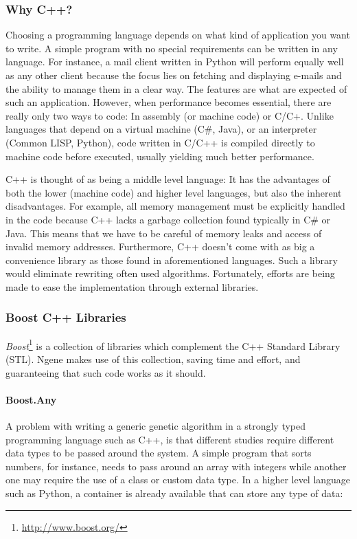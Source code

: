 \subsubsection{Why C++?}
Choosing a programming language depends on what kind of application you want to write. A simple program with no special requirements can be written in any language. For instance, a mail client written in Python will perform equally well as any other client because the focus lies on fetching and displaying e-mails and the ability to manage them in a clear way. The features are what are expected of such an application. However, when performance becomes essential, there are really only two ways to code: In assembly (or machine code) or C/C+. Unlike languages that depend on a virtual machine (C\#, Java), or an interpreter (Common LISP, Python), code written in C/C++ is compiled directly to machine code before executed, usually yielding much better performance.

C++ is thought of as being a middle level language: It has the advantages of both the lower (machine code) and higher level languages, but also the inherent disadvantages. For example, all memory management must be explicitly handled in the code because C++ lacks a garbage collection found typically in C\# or Java. This means that we have to be careful of memory leaks and access of invalid memory addresses. Furthermore, C++ doesn't come with as big a convenience library as those found in aforementioned languages. Such a library would eliminate rewriting often used algorithms. Fortunately, efforts are being made to ease the implementation through external libraries.

\subsubsection{Boost C++ Libraries}
\emph{Boost}\footnote{\url{http://www.boost.org/}} is a collection of libraries which complement the C++ Standard Library (STL). Ngene makes use of this collection, saving time and effort, and guaranteeing that such code works as it should.

\paragraph{\textbf{Boost.Any}}\cite{henney2001}
A problem with writing a generic genetic algorithm in a strongly typed programming language such as C++, is that different studies require different data types to be passed around the system. A simple program that sorts numbers, for instance, needs to pass around an array with integers while another one may require the use of a class or custom data type. In a higher level language such as Python, a container is already available that can store any type of data:

